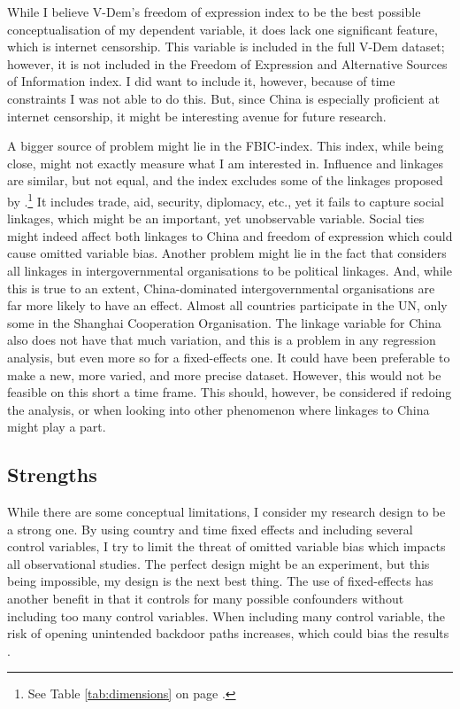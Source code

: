 While I believe V-Dem's freedom of expression index to be the best possible conceptualisation of my dependent variable, it does lack one significant feature, which is internet censorship. This variable is included in the full V-Dem dataset; however, it is not included in the Freedom of Expression and Alternative Sources of Information index. I did want to include it, however, because of time constraints I was not able to do this. But, since China is especially proficient at internet censorship, it might be interesting avenue for future research.

A bigger source of problem might lie in the FBIC-index. This index, while being close, might not exactly measure what I am interested in. Influence and linkages are similar, but not equal, and the index excludes some of the linkages proposed by \citet{levitsky_competitive_2010}.\footnote{See Table \ref{tab:dimensions} on page \pageref{tab:dimensions}.} It includes trade, aid, security, diplomacy, etc., yet it fails to capture social linkages, which might be an important, yet unobservable variable. Social ties might indeed affect both linkages to China and freedom of expression which could cause omitted variable bias. Another problem might lie in the fact that \citep{moyer_china-us_2021} considers all linkages in intergovernmental organisations to be political linkages. And, while this is true to an extent, China-dominated intergovernmental organisations are far more likely to have an effect. Almost all countries participate in the UN, only some in the Shanghai Cooperation Organisation. The linkage variable for China also does not have that much variation, and this is a problem in any regression analysis, but even more so for a fixed-effects one. It could have been preferable to make a new, more varied, and more precise dataset. However, this would not be feasible on this short a time frame. This should, however, be considered if redoing the analysis, or when looking into other phenomenon where linkages to China might play a part.

\subsection{Strengths}
While there are some conceptual limitations, I consider my research design to be a strong one. By using country and time fixed effects and including several control variables, I try to limit the threat of omitted variable bias which impacts all observational studies. The perfect design might be an experiment, but this being impossible, my design is the next best thing. The use of fixed-effects has another benefit in that it controls for many possible confounders without including too many control variables. When including many control variable, the risk of opening unintended backdoor paths increases, which could bias the results \citep[Chapter 3]{cunningham_causal_2021}.

